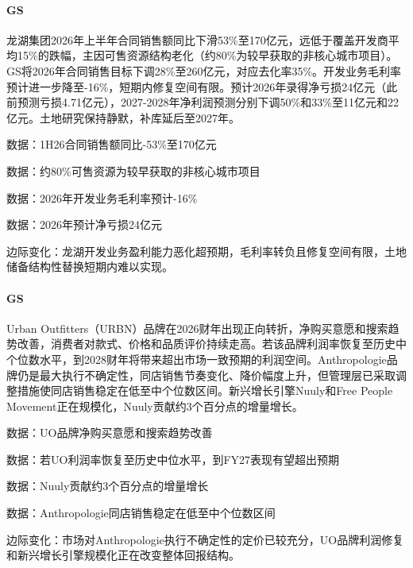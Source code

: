 \documentclass[11pt]{ctexart}
\begin{document}
\paragraph{GS} 龙湖集团2026年上半年合同销售额同比下滑53\%至170亿元，远低于覆盖开发商平均15\%的跌幅，主因可售资源结构老化（约80\%为较早获取的非核心城市项目）。GS将2026年合同销售目标下调28\%至260亿元，对应去化率35\%。开发业务毛利率预计进一步降至-16\%，短期内修复空间有限。预计2026年录得净亏损24亿元（此前预测亏损4.71亿元），2027-2028年净利润预测分别下调50\%和33\%至11亿元和22亿元。土地研究保持静默，补库延后至2027年。
{\small\color{refgray}数据：1H26合同销售额同比-53\%至170亿元\par}
{\small\color{refgray}数据：约80\%可售资源为较早获取的非核心城市项目\par}
{\small\color{refgray}数据：2026年开发业务毛利率预计-16\%\par}
{\small\color{refgray}数据：2026年预计净亏损24亿元\par}
{\small\color{refgray}边际变化：龙湖开发业务盈利能力恶化超预期，毛利率转负且修复空间有限，土地储备结构性替换短期内难以实现。\par}
\paragraph{GS} Urban Outfitters（URBN）品牌在2026财年出现正向转折，净购买意愿和搜索趋势改善，消费者对款式、价格和品质评价持续走高。若该品牌利润率恢复至历史中个位数水平，到2028财年将带来超出市场一致预期的利润空间。Anthropologie品牌仍是最大执行不确定性，同店销售节奏变化、降价幅度上升，但管理层已采取调整措施使同店销售稳定在低至中个位数区间。新兴增长引擎Nuuly和Free People Movement正在规模化，Nuuly贡献约3个百分点的增量增长。
{\small\color{refgray}数据：UO品牌净购买意愿和搜索趋势改善\par}
{\small\color{refgray}数据：若UO利润率恢复至历史中位水平，到FY27表现有望超出预期\par}
{\small\color{refgray}数据：Nuuly贡献约3个百分点的增量增长\par}
{\small\color{refgray}数据：Anthropologie同店销售稳定在低至中个位数区间\par}
{\small\color{refgray}边际变化：市场对Anthropologie执行不确定性的定价已较充分，UO品牌利润修复和新兴增长引擎规模化正在改变整体回报结构。\par}
\end{document}
